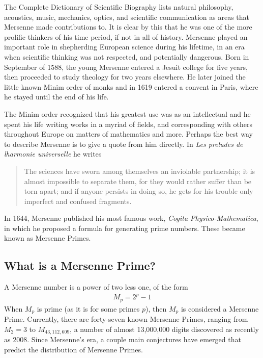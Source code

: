 
The Complete Dictionary of Scientific Biography\cite{scibio} lists natural philosophy, acoustics, music, mechanics, optics, and scientific communication as areas that Mersenne made contributions to.  It is clear by this that he was one of the more prolific thinkers of his time period, if not in all of history. Mersenne played an important role in shepherding European science during his lifetime, in an era when scientific thinking was not respected, and potentially dangerous.  Born in September of 1588, the young Mersenne entered a Jesuit college for five years, then proceeded to study theology for two years elsewhere. He later joined the little known Minim order of monks and in 1619 entered a convent in Paris, where he stayed until the end of his life.  

The Minim order recognized that his greatest use was as an intellectual and he spent his life writing works in a myriad of fields, and corresponding with others throughout Europe on matters of mathematics and more. Perhaps the best way to describe Mersenne is to give a quote from him directly. In \emph{Les preludes de lharmonie universelle} he writes \cite{lfrench}

\begin{quote}
The sciences have sworn among themselves an inviolable partnership; it is almost impossible to separate them, for they would rather suffer than be torn apart; and if anyone persists in doing so, he gets for his trouble only imperfect and confused fragments. 
\end{quote}

In 1644, Mersenne published his most famous work, \emph{Cogita Physico-Mathematica}, in which he proposed a formula for generating prime numbers. These became known as Mersenne Primes.

\subsection{What is a Mersenne Prime?}

A Mersenne number is a power of two less one, of the form
\begin{align}
M_p = 2^p - 1
\end{align}
When $M_p$ is prime (as it is for some primes $p$), then $M_p$ is considered a Mersenne Prime. Currently,
there are forty-seven known Mersenne Primes, ranging from $M_2 = 3$ to $M_{43,112,609}$, a number of almost
13,000,000 digits discovered as recently as 2008. Since Mersenne's era, a couple main conjectures have emerged
that predict the distribution of Mersenne Primes.


